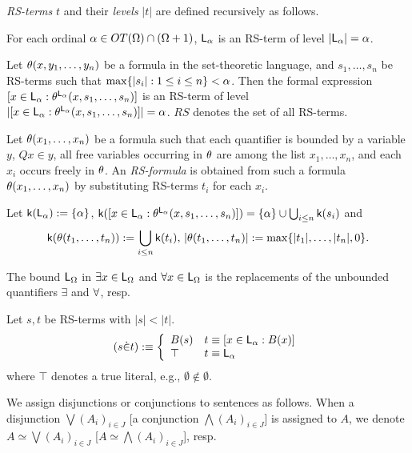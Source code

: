 \documentclass{article}
\begin{document}
{\rm
\textit{RS-terms} $t$ and their \textit{levels} $|t|$ are defined recursively as follows.
\benu

\item
For each ordinal $\alpha\in OT(\Omega)\cap(\Omega+1)$, 
${\sf L}_{\alpha}$ is an RS-term of level $|{\sf L}_{\alpha}|=\alpha$.


\item
Let $\theta(x,y_{1},\ldots,y_{n})$ be a formula in the set-theoretic language, and
$s_{1},\ldots,s_{n}$ be RS-terms such that $\max\{|s_{i}|:1\leq i\leq n\}<\alpha$.
Then the formal expression
$[x\in {\sf L}_{\alpha}: \theta^{{\sf L}_{\alpha}}(x,s_{1},\ldots,s_{n})]$ is an RS-term
of level
$|[x\in {\sf L}_{\alpha}: \theta^{{\sf L}_{\alpha}}(x,s_{1},\ldots,s_{n})]|=\alpha$.
\eenu
$RS$ denotes the set of all RS-terms.




Let $\theta(x_{1},\ldots,x_{n})$ be a formula 
such that each quantifier is bounded by a variable $y$, $Q x\in y$,
 all free variables occurring in $\theta$ are among the list $x_{1},\ldots,x_{n}$,
and each $x_{i}$ occurs freely in $\theta$.
An \textit{RS-formula} is obtained from such a formula $\theta(x_{1},\ldots,x_{n})$
by substituting RS-terms $t_{i}$ for each $x_{i}$.


Let ${\sf k}({\sf L}_{\alpha}):=\{\alpha\}$, 
${\sf k}([x\in {\sf L}_{\alpha}: \theta^{{\sf L}_{\alpha}}(x,s_{1},\ldots,s_{n})])=\{\alpha\}\cup\bigcup_{i\leq n}{\sf k}(s_{i})$
and
\[
 {\sf k}(\theta(t_{1},\ldots,t_{n})):=\bigcup_{i\leq n}{\sf k}(t_{i}),\,
|\theta(t_{1},\ldots,t_{n})|:=\max\{|t_{1}|,\ldots,|t_{n}|, 0\}
.\]




The bound ${\sf L}_{\Omega}$ in $\exists x\in {\sf L}_{\Omega}$
and $\forall x\in {\sf L}_{\Omega}$ is the replacements of the unbounded quantifiers $\exi$ and $\forall$, resp.
}
\edf


\bdf
{\rm
Let $s,t$ be RS-terms with $|s|<|t|$.
\[
(s\dot{\in}t) :\equiv\left\{
\begin{array}{ll}
B(s) & t\equiv[x\in {\sf L}_{\alpha}: B(x)]
\\
\top & t\equiv{\sf L}_{\alpha} 
 \end{array}
 \right.
\]
where $\top$ denotes a true literal, e.g., $\emptyset\not\in\emptyset$.
}
\edf



We assign disjunctions or conjunctions to sentences as follows.
When a disjunction $\bigvee(A_{i})_{i\in J}$ [a conjunction $\bigwedge(A_{i})_{i\in J}$]
is assigned to $A$,
we denote $A\simeq\bigvee(A_{i})_{i\in J}$ [$A\simeq\bigwedge(A_{i})_{i\in J}$], resp.
\end{document}
